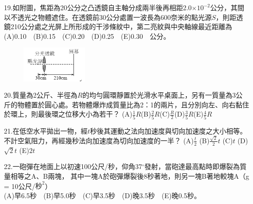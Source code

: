 \documentclass[cn,10pt,math=newtx]{elegantbook}
\begin{document}
\begin{example}
   19.如附圖，焦距為20公分之凸透鏡自主軸分成兩半後再相距2.0$\times10^{-2}$公分，其間以不透光之物體遮住。在透鏡前30公分處置一波長為600奈米的點光源$S$，則距透鏡210公分處之光屏上所形成的干涉條紋中，第二亮紋與中央軸線最近距離為
   (A)0.10　(B)0.15　(C)0.20　(D)0.25　(E)0.30　公分。
   \\
    \rightline{[成德高中教甄109]}
\end{example}
\begin{solution}
    
\end{solution}
\begin{figure}[htbp]
    \flushright
    \includegraphics[width=0.3\textwidth]{image/109成德19.png}
  \end{figure}
\newpage

\begin{example}
   20.質量為2公斤、半徑為$R$的均勻圓環靜置於光滑水平桌面上，另有一質量為3公斤的物體置於圓心處。若物體爆炸成質量比為2：1的兩片，且分別向左、向右黏住於環上，則最後環之位移大小為若干？
   (A)$\frac{1}{5}R$(B)$\frac{2}{5}R$(C)$\frac{R}{2}$(D)$\frac{3}{5}R$(E)$\frac{4}{5}R$
   \\
    \rightline{[成德高中教甄109]}
\end{example}
\begin{solution}
    
\end{solution}

\newpage


\begin{example}
   21.在低空水平拋出一物，經$t$秒後其運動之法向加速度與切向加速度之大小相等。不計空氣阻力，再經幾秒法向加速度為切向加速度的一半？
   (A)$\frac{t}{2}$ (B)$\frac{\sqrt{2}}{2}t$ (C)$t$ (D)$\sqrt{2}t$ (E)$2t$
   \\
    \rightline{[成德高中教甄109]}
\end{example}
\begin{solution}
    
\end{solution}

\newpage


\begin{example}
   22.一砲彈在地面上以初速100公尺/秒，仰角37$^\circ$發射，當砲達最高點時即爆裂為質量相等之A、B兩塊，
   其中一塊A於砲彈爆裂後8秒著地，則另一塊B著地較塊A（g = 10公尺/$秒^2$）\\
   (A)早6.5秒　(B)早5.0秒　(C)早3.5秒　(D)晚3.5秒　(E)晚0.5秒。
   \\
    \rightline{[成德高中教甄109]}
\end{example}
\begin{solution}
    
\end{solution}
\end{document}
